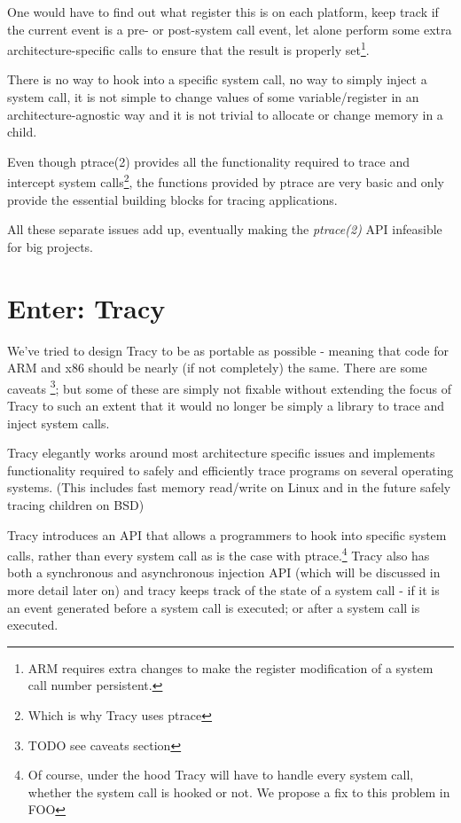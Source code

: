 \documentclass[a4paper, twoside, 10pt]{report}
\begin{document}
One would have to find out what register this is on each platform,
keep track if the current event is a pre- or post-system call event, let alone
perform some extra architecture-specific calls to ensure that the result is
properly set\footnote{ARM requires extra changes to make the register
modification of a system call number persistent.}.

There is no way to hook into a specific system call, no way
to simply inject a system call, it is not simple to change values of some
variable/register in an architecture-agnostic way and it is not trivial
to allocate or change memory in a child.

Even though ptrace(2) provides all the functionality required to trace and
intercept system calls\footnote{Which is why Tracy uses ptrace},
the functions provided by ptrace are very basic and only provide the
essential building blocks for tracing applications.

All these separate issues add up, eventually making the \textit{ptrace(2)} API
infeasible for big projects. %

\section{Enter: Tracy}

We've tried to design Tracy to be as portable as possible - meaning that code
for ARM and x86 should be nearly (if not completely) the same. There are some
caveats \footnote{TODO see caveats section}; but some of these are simply not
fixable without extending the focus of Tracy to such an extent that it would no
longer be simply a library to trace and inject system calls.

Tracy elegantly works around most architecture specific issues and implements
functionality required to safely and efficiently trace programs on several
operating systems. (This includes fast memory read/write on Linux
and in the future safely tracing children on BSD)

Tracy introduces an API that allows a programmers to hook into specific system
calls, rather than every system call as is the case with ptrace.\footnote{Of
course, under the hood Tracy will have to handle every system call, whether
the system call is hooked or not. We propose a fix to this problem in FOO}%
Tracy also has both a synchronous and asynchronous injection API (which
will be discussed in more detail later on) and tracy keeps track of the state of
a system call - if it is an event generated before a system call is executed; or
after a system call is executed.
\end{document}
